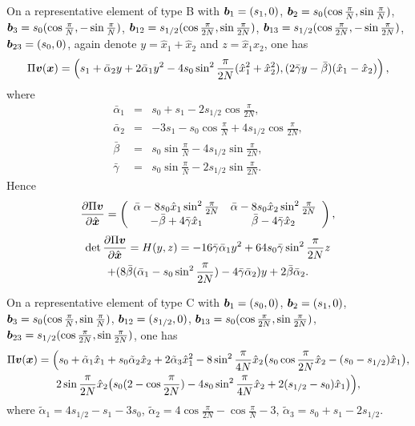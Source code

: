 \documentclass[12pt]{article}
\renewcommand{\vec}[1]{\mbox{\boldmath$#1$}}
\numberwithin{equation}{section}
\begin{document}
On a representative element of type B with
$\vec{b}_1=(s_1,0)$, $\vec{b}_2=s_0(\cos{\frac{\pi}{N}},\sin{\frac{\pi}{N}})$,
$\vec{b}_3=s_0(\cos{\frac{\pi}{N}},-\sin{\frac{\pi}{N}})$,
$\vec{b}_{12}=s_{1/2}(\cos{\frac{\pi}{2N}},\sin{\frac{\pi}{2N}})$,
$\vec{b}_{13}=s_{1/2}(\cos{\frac{\pi}{2N}},-\sin{\frac{\pi}{2N}})$,
$\vec{b}_{23}=(s_0,0)$, again denote $y=\hat{x}_1+\hat{x}_2$ and
$z=\hat{x}_1\hat{x}_2$, one has
\begin{equation}\label{PiB}
\Pi \vec{v}(\vec{x})=\left(s_1+\bar{\alpha}_2 y+2\bar{\alpha}_1
y^2-4s_0\sin^2{\frac{\pi}{2N}}(\hat{x}_1^2+\hat{x}_2^2), (2\bar{\gamma}
y-\bar{\beta})(\hat{x}_1-\hat{x}_2)\right),
\end{equation}
where
\begin{eqnarray}
\bar{\alpha}_1&=&s_0+s_1-2s_{1/2}\cos{\frac{\pi}{2N}},\label{pBalpha1}\\
\bar{\alpha}_2&=&-3s_1-s_0\cos{\frac{\pi}{N}}+4s_{1/2}
\cos{\frac{\pi}{2N}}, \label{pBalpha2}\\
\bar{\beta}&=&s_0 \sin{\frac{\pi}{N}}-4s_{1/2} \sin{\frac{\pi}{2N}},\label{pBbeta}
\\ \bar{\gamma}&=&s_0 \sin{\frac{\pi}{N}}-2s_{1/2} \sin{\frac{\pi}{2N}}.\label{pBgamma}
\end{eqnarray}
Hence
\begin{equation}\label{JacobipB}
\frac{\partial \Pi \vec{v}}{\partial \hat{\vec{x}}}=\left(
\begin{array}{cc}
\bar{\alpha}-8s_0\hat{x}_1 \sin^2 {\frac{\pi}{2N}} & \bar{\alpha}-8s_0\hat{x}_2 \sin^2
{\frac{\pi}{2N}} \\
-\bar{\beta}+4\bar{\gamma} \hat{x}_1 & \bar{\beta}-4 \bar{\gamma} \hat{x}_2\\
\end{array}
\right),
\end{equation}
\begin{multline}\label{det PipB}
\det \frac{\partial \Pi \vec{v}}{\partial \hat{\vec{x}}}=H(y,z)=
-16 \bar{\gamma} \bar{\alpha}_1 y^2 +64 s_0\bar{\gamma} \sin^2{\frac{\pi}{2N}}z\\
+
(8\bar{\beta} (\bar{\alpha}_1-s_0\sin^2{\frac{\pi}{2N}})-4 \bar{\gamma} \bar{\alpha}_2)y+2
\bar{\beta} \bar{\alpha}_2.
\end{multline}

On a representative element of type C with
$\vec{b}_1=(s_0,0)$, $\vec{b}_2=(s_1,0)$,
$\vec{b}_3=s_0(\cos{\frac{\pi}{N}},\sin{\frac{\pi}{N}})$,
$\vec{b}_{12}=(s_{1/2},0)$,
$\vec{b}_{13}=s_0(\cos{\frac{\pi}{2N}},\sin{\frac{\pi}{2N}})$,
$\vec{b}_{23}=s_{1/2}(\cos{\frac{\pi}{2N}},\sin{\frac{\pi}{2N}})$, one has
\begin{multline}\label{PiC}
\Pi \vec{v}(\vec{x})=\Big(s_0+\tilde{\alpha}_1\hat{x}_1+s_0\tilde{\alpha}_2\hat{x}_2+
2\tilde{\alpha}_3\hat{x}_1^2
-8\sin^2{\frac{\pi}{4N}}\hat{x}_2\big(s_0\cos{\frac{\pi}{2N}}\hat{x}_2-(s_0-s_{1/2})
\hat{x}_1\big), \\
2\sin{\frac{\pi}{2N}}\hat{x}_2\big(s_0(2-\cos{\frac{\pi}{2N}})
-4s_0\sin^2{\frac{\pi}{4N}}\hat{x}_2+2(s_{1/2}-s_0)\hat{x}_1\big) \Big),
\end{multline}
where $\tilde{\alpha}_1=4s_{1/2}-s_1-3s_0$,
$\tilde{\alpha}_2=4\cos{\frac{\pi}{2N}}-\cos{\frac{\pi}{N}}-3$,
$\tilde{\alpha}_3=s_0+s_1-2s_{1/2}$.
\end{document}
